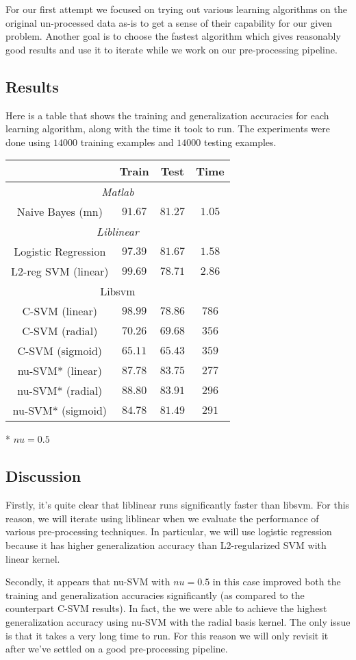 For our first attempt we focused on trying out various learning algorithms
on the original un-processed data as-is to get a sense of their capability
for our given problem. Another goal is to choose the fastest algorithm
which gives reasonably good results and use it to iterate while we
work on our pre-processing pipeline.


\subsection*{Results}

Here is a table that shows the training and generalization accuracies
for each learning algorithm, along with the time it took to run. The
experiments were done using $14000$ training examples and $14000$
testing examples.

\begin{center}
\begin{tabular}{|c|c|c|c|}
\hline 
 & Train & Test & Time\tabularnewline
\hline 
\multicolumn{4}{|c}{\emph{Matlab}}\tabularnewline
\hline 
Naive Bayes (mn) & $91.67$ & $81.27$ & $1.05$\tabularnewline
\hline 
\multicolumn{4}{|c}{\emph{Liblinear}}\tabularnewline
\hline 
Logistic Regression & $97.39$ & $81.67$ & $1.58$\tabularnewline
\hline 
L2-reg SVM (linear) & $99.69$ & $78.71$ & $2.86$\tabularnewline
\hline 
\multicolumn{4}{|c}{Libsvm}\tabularnewline
\hline 
C-SVM (linear) & $98.99$ & $78.86$ & $786$\tabularnewline
\hline 
C-SVM (radial) & $70.26$ & $69.68$ & $356$\tabularnewline
\hline 
C-SVM (sigmoid) & $65.11$ & $65.43$ & $359$\tabularnewline
\hline 
nu-SVM{*} (linear) & $87.78$ & $83.75$ & $277$\tabularnewline
\hline 
nu-SVM{*} (radial) & $88.80$ & $83.91$ & $296$\tabularnewline
\hline 
nu-SVM{*} (sigmoid) & $84.78$ & $81.49$ & $291$\tabularnewline
\hline 
\end{tabular}
\par\end{center}

{*} $nu=0.5$


\subsection*{Discussion}

Firstly, it's quite clear that liblinear runs significantly faster
than libsvm. For this reason, we will iterate using liblinear when
we evaluate the performance of various pre-processing techniques.
In particular, we will use logistic regression because it has higher
generalization accuracy than L2-regularized SVM with linear kernel.

Secondly, it appears that nu-SVM with $nu=0.5$ in this case improved
both the training and generalization accuracies significantly (as
compared to the counterpart C-SVM results). In fact, the we were able
to achieve the highest generalization accuracy using nu-SVM with the
radial basis kernel. The only issue is that it takes a very long time
to run. For this reason we will only revisit it after we've settled
on a good pre-processing pipeline.
